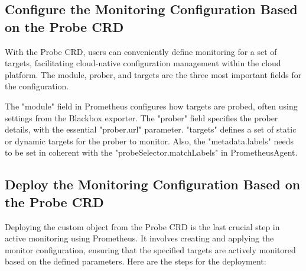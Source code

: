 \subsection{Configure the Monitoring Configuration Based on the Probe CRD}

With the Probe \ac{CRD}, users can conveniently define monitoring for a set of targets, facilitating cloud-native configuration management within the cloud platform. The module, prober, and targets are the three most important fields for the configuration. 

The "module" field in Prometheus configures how targets are probed, often using settings from the Blackbox exporter. The "prober" field specifies the prober details, with the essential "prober.url" parameter. "targets" defines a set of static or dynamic targets for the prober to monitor. Also, the "metadata.labels" needs to be set in coherent with the "probeSelector.matchLabels" in PrometheusAgent. 

\subsection{Deploy the Monitoring Configuration Based on the Probe CRD}

Deploying the custom object from the Probe \ac{CRD} is the last crucial step in active monitoring using Prometheus. It involves creating and applying the monitor configuration, ensuring that the specified targets are actively monitored based on the defined parameters. Here are the steps for the deployment:

